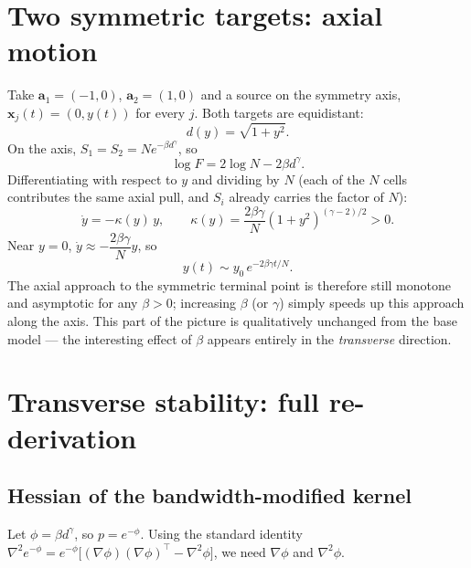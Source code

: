 \documentclass[11pt,a4paper]{article}
\theoremstyle{plain}
\theoremstyle{definition}
\theoremstyle{remark}
\newcommand{\bx}{\bm{x}}
\newcommand{\ba}{\bm{a}}
\newcommand{\bw}{\beta}
\begin{document}
\section{Two symmetric targets: axial motion}
\label{sec:two_axis}

Take $\ba_1=(-1,0)$, $\ba_2=(1,0)$ and a source on the symmetry axis,
$\bx_j(t)=(0,y(t))$ for every $j$. Both targets are equidistant:
\[
  d(y)=\sqrt{1+y^2}.
\]
On the axis, $S_1=S_2=Ne^{-\bw d^{\gamma}}$, so
\[
  \log F = 2\log N - 2\bw d^{\gamma}.
\]
Differentiating with respect to $y$ and dividing by $N$ (each of the $N$
cells contributes the same axial pull, and $S_i$ already carries the factor
of $N$):
\begin{equation}
  \boxed{
  \dot y = -\kappa(y)\,y,
  \qquad
  \kappa(y)=\frac{2\bw\gamma}{N}(1+y^2)^{(\gamma-2)/2}>0.
  }
  \label{eq:ydot_beta}
\end{equation}
Near $y=0$, $\dot y\approx-\dfrac{2\bw\gamma}{N}y$, so
\[
  y(t)\sim y_0\, e^{-2\bw\gamma t/N}.
\]
The axial approach to the symmetric terminal point is therefore still
monotone and asymptotic for any $\bw>0$; increasing $\bw$ (or $\gamma$)
simply speeds up this approach along the axis. This part of the picture is
qualitatively unchanged from the base model — the interesting effect of
$\bw$ appears entirely in the \emph{transverse} direction.

\section{Transverse stability: full re-derivation}
\label{sec:transverse}

\subsection{Hessian of the bandwidth-modified kernel}

Let $\phi=\bw d^{\gamma}$, so $p=e^{-\phi}$. Using the standard identity
$\nabla^2 e^{-\phi}=e^{-\phi}\big[(\nabla\phi)(\nabla\phi)^{\top}-\nabla^2\phi\big]$,
we need $\nabla\phi$ and $\nabla^2\phi$.
\end{document}
